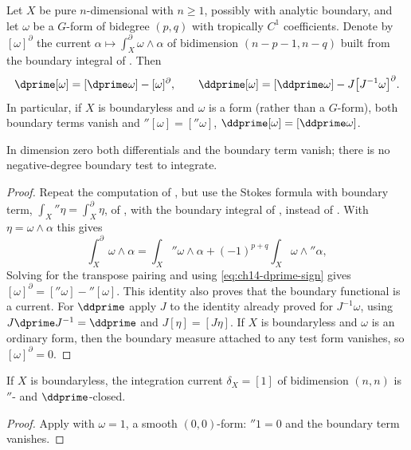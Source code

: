 \begin{proposition}
\label{prop:ch14-boundary-current}
Let $X$ be pure $n$-dimensional with $n\ge1$, possibly with analytic
boundary, and let
$\omega$ be a $G$-form of bidegree $(p,q)$ with tropically $C^1$
coefficients.  Denote by $[\omega]^\partial$ the current
$\alpha\mapsto\int_X^\partial\omega\wedge\alpha$ of bidimension
$(n-p-1,n-q)$ built from the boundary integral of
.  Then
\[
 \dprime[\omega]=[\dprime\omega]-[\omega]^\partial,
 \qquad
 \ddprime[\omega]=[\ddprime\omega]-J\bigl[J^{-1}\omega\bigr]^\partial .
\]
In particular, if $X$ is boundaryless and $\omega$ is a form (rather than a
$G$-form), both boundary terms vanish and
$\dprime[\omega]=[\dprime\omega]$, $\ddprime[\omega]=[\ddprime\omega]$.
\end{proposition}

In dimension zero both differentials and the boundary term vanish;
there is no negative-degree boundary test to integrate.

\begin{proof}
Repeat the computation of , but use the Stokes
formula with boundary term,
$\int_X\dprime\eta=\int_X^\partial\eta$, of
, with the boundary integral of
, instead of
.  With
$\eta=\omega\wedge\alpha$ this gives
\[
 \int_X^\partial\omega\wedge\alpha
 =\int_X\dprime\omega\wedge\alpha
   +(-1)^{p+q}\int_X\omega\wedge\dprime\alpha,
\]
Solving for the transpose pairing and using
\eqref{eq:ch14-dprime-sign} gives
$[\omega]^\partial=[\dprime\omega]-\dprime[\omega]$.
This identity also proves that the boundary functional is a current.  For $\ddprime$ apply
$J$ to the identity already proved for $J^{-1}\omega$, using
$J\dprime J^{-1}=\ddprime$ and $J[\eta]=[J\eta]$.  If $X$ is boundaryless and
$\omega$ is an ordinary form, then the boundary measure attached to any test
form vanishes, so $[\omega]^\partial=0$.
\end{proof}

\begin{corollary}
\label{cor:ch14-delta-x-closed}
If $X$ is boundaryless, the integration current
$\delta_X=[1]$ of bidimension $(n,n)$ is $\dprime$- and $\ddprime$-closed.
\end{corollary}

\begin{proof}
Apply  with $\omega=1$, a smooth
$(0,0)$-form: $\dprime1=0$ and the boundary term vanishes.
\end{proof}

